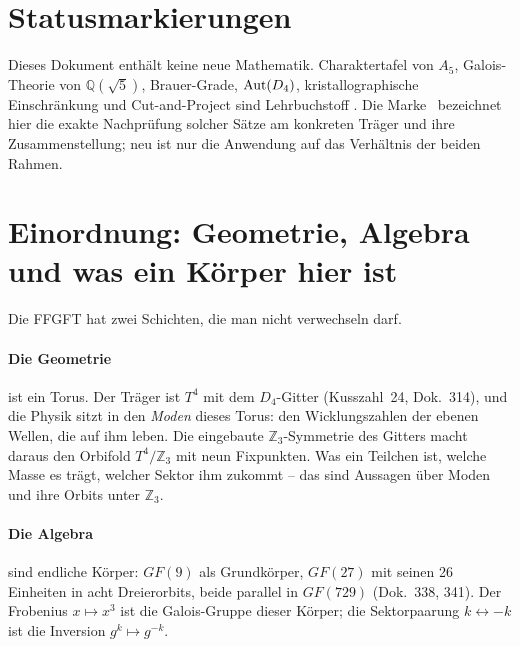 \section*{Statusmarkierungen}


Dieses Dokument enthält keine neue Mathematik. Charaktertafel von $A_5$,
Galois-Theorie von $\mathbb{Q}(\sqrt5)$, Brauer-Grade, ${\rm Aut}(D_4)$,
kristallographische Einschränkung und Cut-and-Project sind Lehrbuchstoff
\EM. Die Marke \BM\ bezeichnet hier die exakte Nachprüfung solcher Sätze am
konkreten Träger und ihre Zusammenstellung; neu ist nur die Anwendung auf
das Verhältnis der beiden Rahmen.

\section{Einordnung: Geometrie, Algebra und was ein Körper hier ist}

Die FFGFT hat zwei Schichten, die man nicht verwechseln darf.

\paragraph{Die Geometrie} ist ein Torus. Der Träger ist $T^4$ mit dem
$D_4$-Gitter (Kusszahl~24, Dok.~314), und die Physik sitzt in den
\emph{Moden} dieses Torus: den Wicklungszahlen der ebenen Wellen, die auf
ihm leben. Die eingebaute $\mathbb{Z}_3$-Symmetrie des Gitters macht daraus
den Orbifold $T^4/\mathbb{Z}_3$ mit neun Fixpunkten. Was ein Teilchen ist,
welche Masse es trägt, welcher Sektor ihm zukommt -- das sind Aussagen
über Moden und ihre Orbits unter $\mathbb{Z}_3$.

\paragraph{Die Algebra} sind endliche Körper: $GF(9)$ als Grundkörper,
$GF(27)$ mit seinen 26 Einheiten in acht Dreierorbits, beide parallel in
$GF(729)$ (Dok.~338, 341). Der Frobenius $x\mapsto x^3$ ist die
Galois-Gruppe dieser Körper; die Sektorpaarung $k\leftrightarrow-k$ ist die
Inversion $g^k\mapsto g^{-k}$.

